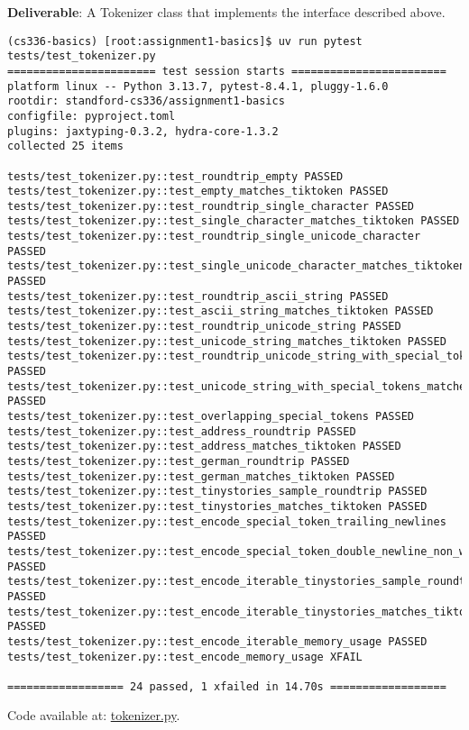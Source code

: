 \textbf{Deliverable}: A Tokenizer class that implements the interface described above.

\begin{lstlisting}
(cs336-basics) [root:assignment1-basics]$ uv run pytest tests/test_tokenizer.py
======================= test session starts ========================
platform linux -- Python 3.13.7, pytest-8.4.1, pluggy-1.6.0
rootdir: standford-cs336/assignment1-basics
configfile: pyproject.toml
plugins: jaxtyping-0.3.2, hydra-core-1.3.2
collected 25 items                                                 

tests/test_tokenizer.py::test_roundtrip_empty PASSED
tests/test_tokenizer.py::test_empty_matches_tiktoken PASSED
tests/test_tokenizer.py::test_roundtrip_single_character PASSED
tests/test_tokenizer.py::test_single_character_matches_tiktoken PASSED
tests/test_tokenizer.py::test_roundtrip_single_unicode_character PASSED
tests/test_tokenizer.py::test_single_unicode_character_matches_tiktoken PASSED
tests/test_tokenizer.py::test_roundtrip_ascii_string PASSED
tests/test_tokenizer.py::test_ascii_string_matches_tiktoken PASSED
tests/test_tokenizer.py::test_roundtrip_unicode_string PASSED
tests/test_tokenizer.py::test_unicode_string_matches_tiktoken PASSED
tests/test_tokenizer.py::test_roundtrip_unicode_string_with_special_tokens PASSED
tests/test_tokenizer.py::test_unicode_string_with_special_tokens_matches_tiktoken PASSED
tests/test_tokenizer.py::test_overlapping_special_tokens PASSED
tests/test_tokenizer.py::test_address_roundtrip PASSED
tests/test_tokenizer.py::test_address_matches_tiktoken PASSED
tests/test_tokenizer.py::test_german_roundtrip PASSED
tests/test_tokenizer.py::test_german_matches_tiktoken PASSED
tests/test_tokenizer.py::test_tinystories_sample_roundtrip PASSED
tests/test_tokenizer.py::test_tinystories_matches_tiktoken PASSED
tests/test_tokenizer.py::test_encode_special_token_trailing_newlines PASSED
tests/test_tokenizer.py::test_encode_special_token_double_newline_non_whitespace PASSED
tests/test_tokenizer.py::test_encode_iterable_tinystories_sample_roundtrip PASSED
tests/test_tokenizer.py::test_encode_iterable_tinystories_matches_tiktoken PASSED
tests/test_tokenizer.py::test_encode_iterable_memory_usage PASSED
tests/test_tokenizer.py::test_encode_memory_usage XFAIL

================== 24 passed, 1 xfailed in 14.70s ==================
\end{lstlisting}

\begin{answer}
Code available at: \href{https://github.com/donglinkang2021/cs336-assignment1-basics/blob/main/cs336_basics/tokenizer.py}{tokenizer.py}.
\end{answer}

